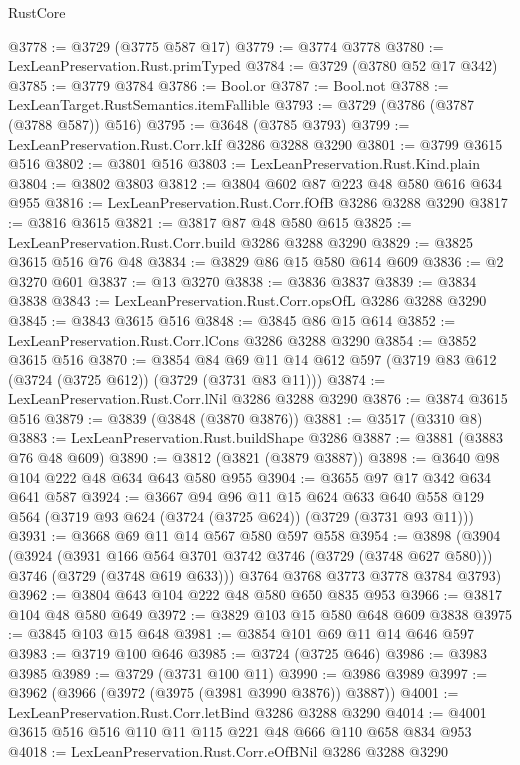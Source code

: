\begin{lexlean}{RustCore}
\begin{coremodule}
@3778 := @3729 (@3775 @587 @17)
@3779 := @3774 @3778
@3780 := LexLeanPreservation.Rust.primTyped
@3784 := @3729 (@3780 @52 @17 @342)
@3785 := @3779 @3784
@3786 := Bool.or
@3787 := Bool.not
@3788 := LexLeanTarget.RustSemantics.itemFallible
@3793 := @3729 (@3786 (@3787 (@3788 @587)) @516)
@3795 := @3648 (@3785 @3793)
@3799 := LexLeanPreservation.Rust.Corr.kIf @3286 @3288 @3290
@3801 := @3799 @3615 @516
@3802 := @3801 @516
@3803 := LexLeanPreservation.Rust.Kind.plain
@3804 := @3802 @3803
@3812 := @3804 @602 @87 @223 @48 @580 @616 @634 @955
@3816 := LexLeanPreservation.Rust.Corr.fOfB @3286 @3288 @3290
@3817 := @3816 @3615
@3821 := @3817 @87 @48 @580 @615
@3825 := LexLeanPreservation.Rust.Corr.build @3286 @3288 @3290
@3829 := @3825 @3615 @516 @76 @48
@3834 := @3829 @86 @15 @580 @614 @609
@3836 := @2 @3270 @601
@3837 := @13 @3270
@3838 := @3836 @3837
@3839 := @3834 @3838
@3843 := LexLeanPreservation.Rust.Corr.opsOfL @3286 @3288 @3290
@3845 := @3843 @3615 @516
@3848 := @3845 @86 @15 @614
@3852 := LexLeanPreservation.Rust.Corr.lCons @3286 @3288 @3290
@3854 := @3852 @3615 @516
@3870 := @3854
    @84
    @69
    @11
    @14
    @612
    @597
    (@3719 @83 @612 (@3724 (@3725 @612)) (@3729 (@3731 @83 @11)))
@3874 := LexLeanPreservation.Rust.Corr.lNil @3286 @3288 @3290
@3876 := @3874 @3615 @516
@3879 := @3839 (@3848 (@3870 @3876))
@3881 := @3517 (@3310 @8)
@3883 := LexLeanPreservation.Rust.buildShape @3286
@3887 := @3881 (@3883 @76 @48 @609)
@3890 := @3812 (@3821 (@3879 @3887))
@3898 := @3640 @98 @104 @222 @48 @634 @643 @580 @955
@3904 := @3655 @97 @17 @342 @634 @641 @587
@3924 := @3667
    @94
    @96
    @11
    @15
    @624
    @633
    @640
    @558
    @129
    @564
    (@3719 @93 @624 (@3724 (@3725 @624)) (@3729 (@3731 @93 @11)))
@3931 := @3668 @69 @11 @14 @567 @580 @597 @558
@3954 := @3898
    (@3904
      (@3924
        (@3931 @166 @564 @3701 @3742 @3746 (@3729 (@3748 @627 @580)))
        @3746
        (@3729 (@3748 @619 @633)))
      @3764
      @3768
      @3773
      @3778
      @3784
      @3793)
@3962 := @3804 @643 @104 @222 @48 @580 @650 @835 @953
@3966 := @3817 @104 @48 @580 @649
@3972 := @3829 @103 @15 @580 @648 @609 @3838
@3975 := @3845 @103 @15 @648
@3981 := @3854 @101 @69 @11 @14 @646 @597
@3983 := @3719 @100 @646
@3985 := @3724 (@3725 @646)
@3986 := @3983 @3985
@3989 := @3729 (@3731 @100 @11)
@3990 := @3986 @3989
@3997 := @3962 (@3966 (@3972 (@3975 (@3981 @3990 @3876)) @3887))
@4001 := LexLeanPreservation.Rust.Corr.letBind @3286 @3288 @3290
@4014 := @4001 @3615 @516 @516 @110 @11 @115 @221 @48 @666 @110 @658 @834 @953
@4018 := LexLeanPreservation.Rust.Corr.eOfBNil @3286 @3288 @3290

\end{coremodule}
\end{lexlean}
